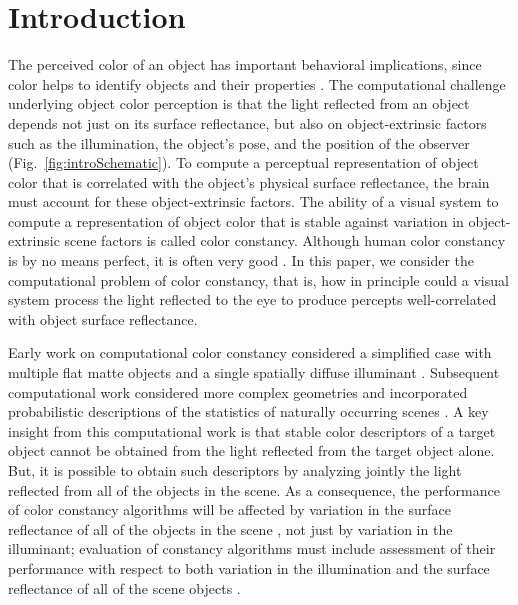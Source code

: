 \documentclass{jov}
\begin{document}

\maketitle

\section{Introduction}
The perceived color of an object has important behavioral implications, since color helps to identify objects and their properties \cite{Mollon89, Jacobs81}.
The computational challenge underlying object color perception is that the light reflected from an object depends not just on its surface reflectance, but also on object-extrinsic factors such as the illumination, the object's pose, and the position of the observer (Fig.~\ref{fig:introSchematic}).
To compute a perceptual representation of object color that is correlated with the object's physical surface reflectance, the brain must account for these object-extrinsic factors.
The ability of a visual system to compute a representation of object color that is stable against variation in object-extrinsic scene factors is called color constancy. 
Although human color constancy is by no means perfect, it is often very good \cite{FosterColorConstancy, BrainardColorConstancy}. 
In this paper, we consider the computational problem of color constancy, that is, how in principle could a visual system process the light reflected to the eye to produce percepts well-correlated with object surface reflectance.

Early work on computational color constancy considered a simplified case with multiple flat matte objects and a single spatially diffuse illuminant \cite{LandRetinex,Buchsbaum80,MaloneyWandell86}.
Subsequent computational work considered more complex geometries and incorporated probabilistic descriptions of the statistics of naturally occurring scenes \cite{funt1988color, D'ZmuraConstancy3, barron2012color, D'ZmuraIversonSinger,BrainardFreeman}.
A key insight from this computational work is that stable color descriptors of a target object cannot be obtained from the light reflected from the target object alone.
But, it is possible to obtain such descriptors by analyzing jointly the light reflected from all of the objects in the scene.
As a consequence, the performance of color constancy algorithms will be affected by variation in the surface reflectance of all of the objects in the scene \cite{BrainardWandellRetinex}, not just by variation in the illuminant; evaluation of constancy algorithms must include assessment of their performance with respect to both variation in the illumination and the surface reflectance of all of the scene objects \cite{BrainardWandellRetinex,BrainardFreeman}. 
\end{document}
